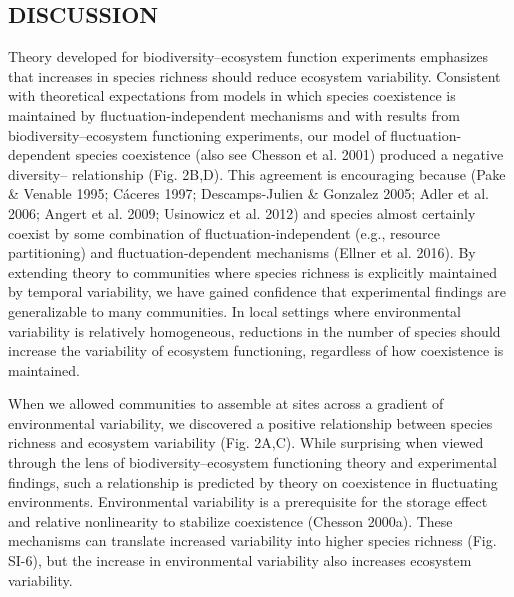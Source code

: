 \documentclass[12pt,]{article}
\begin{document}
\subsection{DISCUSSION}\label{discussion}

Theory developed for biodiversity--ecosystem function experiments
emphasizes that increases in species richness should reduce ecosystem
variability. Consistent with theoretical expectations from models in
which species coexistence is maintained by fluctuation-independent
mechanisms and with results from biodiversity--ecosystem functioning
experiments, our model of fluctuation-dependent species coexistence
(also see Chesson et al. 2001) produced a negative
diversity-- relationship (Fig. 2B,D). This
agreement is encouraging because
(Pake \& Venable 1995; Cáceres 1997; Descamps-Julien \& Gonzalez 2005;
Adler et al. 2006; Angert et al. 2009; Usinowicz et al. 2012) and
species almost certainly coexist by some combination of
fluctuation-independent (e.g., resource partitioning) and
fluctuation-dependent mechanisms (Ellner et al. 2016). By extending
theory to communities where species richness is explicitly maintained by
temporal variability, we have gained confidence that experimental
findings are generalizable to many communities. In local settings where
environmental variability is relatively homogeneous, reductions in the
number of species should increase the variability of ecosystem
functioning, regardless of how coexistence is maintained.

When we allowed communities to assemble at sites across a gradient of
environmental variability, we discovered a positive relationship between
species richness and ecosystem variability (Fig. 2A,C). While surprising
when viewed through the lens of biodiversity--ecosystem functioning
theory and experimental findings, such a relationship is predicted by
theory on coexistence in fluctuating environments. Environmental
variability is a prerequisite for the storage effect and relative
nonlinearity to stabilize coexistence (Chesson 2000a). These mechanisms
can translate increased variability into higher species richness (Fig.
SI-6), but the increase in environmental variability also increases
ecosystem variability.
\end{document}

